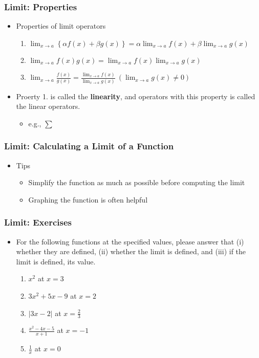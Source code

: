 \documentclass[pdflatex, 12pt]{beamer}
\begin{document}
\begin{frame}
\frametitle{Limit: Properties}
\begin{itemize}
\item Properties of limit operators
 \begin{enumerate}
 \item $\lim_{x \to a} \left\{\alpha f(x) + \beta g(x)\right\} = \alpha \lim_{x \to a} f(x) + \beta \lim_{x \to a} g(x)$
 \item $\lim_{x \to a} f(x)g(x) = \lim_{x \to a} f(x) \lim_{x \to a} g(x)$
 \item $\lim_{x \to a} \frac{f(x)}{g(x)} = \frac{\lim_{x \to a} f(x)}{\lim_{x \to a} g(x)} \ (\lim_{x \to a} g(x) \neq 0)$
 \end{enumerate}
\vspace{0.4cm}
\item Proerty 1. is called the \textbf{linearity}, and operators with this property is called the linear operators.
 \begin{itemize}
 \item e.g., $\sum$
 \end{itemize}
\end{itemize}
\end{frame}

\begin{frame}
\frametitle{Limit: Calculating a Limit of a Function}
\begin{itemize}
\item Tips
 \begin{itemize}
 \item Simplify the function as much as possible before computing the limit
 \item Graphing the function is often helpful
 \end{itemize}
\end{itemize}
\end{frame}

\begin{frame}
\frametitle{Limit: Exercises}
\begin{itemize}
\item For the following functions at the specified values, please answer that (i) whether they are defined, (ii) whether the limit is defined, and (iii) if the limit is defined, its value.
 \begin{enumerate}
 \item $x^2$ at $x = 3$
 \item $3x^2 + 5x - 9$ at $x = 2$
 \item $|3x - 2|$ at $x = \frac{2}{3}$
 \vspace{0.1cm}
 \item $\frac{x^2 - 4x - 5}{x + 1}$ at $x = -1$
 \vspace{0.1cm}
 \item $\frac{1}{x}$ at $x = 0$
 \end{enumerate}
\end{itemize}
\end{frame}
\end{document}
